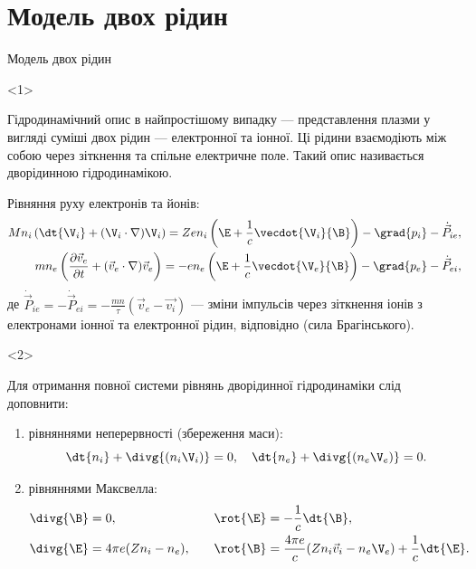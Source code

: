 \documentclass[]{beamer}
\begin{document}
\section{Модель двох рідин}

\begin{frame}{Модель двох рідин}{}
	\begin{onlyenv}
		\begin{block}{}\justifying
			Гідродинамічний опис в найпростішому випадку --- представлення плазми у вигляді суміші двох рідин --- електронної та іонної. Ці рідини взаємодіють між собою через \alert{зіткнення} та \alert{спільне електричне поле}. Такий опис називається дворідинною гідродинамікою.

			\bigskip

			Рівняння руху електронів та йонів:
			\begin{align*}
				Mn_i\left(\dt{\V_i} + (\V_i\cdot\nabla)\V_i \right) = Zen_i \left(\E + \frac1c \vecdot{\V_i}{\B} \right) - \grad{p_i} - \dot{\vec{P}}_{ie}, \\
				mn_e\left(\frac{\partial\vec{v}_e}{\partial t} + (\vec{v}_e\cdot\nabla)\vec{v}_e \right) = -en_e \left(\E + \frac1c \vecdot{\V_e}{\B}\right) -\grad{p_e} - \dot{\vec{P}}_{ei},
			\end{align*}де $\dot{\vec{P}}_{ie} = - \dot{\vec{P}}_{ei} = - \frac{mn}{\tau}(\vec{v}_e - \vec{v_i})$ --- зміни імпульсів через зіткнення іонів з електронами іонної та електронної рідин, відповідно (сила Брагінського).
		\end{block}
	\end{onlyenv}
	\begin{onlyenv}
		\begin{block}{}\justifying
			Для отримання повної системи рівнянь дворідинної гідродинаміки слід доповнити:
			\begin{enumerate}
				\item рівняннями неперервності (збереження маси):
				      \begin{equation*}
					      \dt{n_i} + \divg{(n_{i}\V_i)} = 0, \quad
					      \dt{n_e} + \divg{(n_{e}\V_e)} = 0.
				      \end{equation*}
				\item рівняннями Максвелла:
				      \begin{alignat*}{2}
					      \divg{\B} & = 0, \quad                  &  & \rot{\E} = -\frac1c \dt{\B},                                            \\
					      \divg{\E} & = 4\pi e(Zn_i - n_e), \quad &  & \rot{\B} = \frac{4\pi e}{c}(Zn_i\vec{v}_i - n_e\V_e) + \frac1c \dt{\E}.
				      \end{alignat*}
			\end{enumerate}
		\end{block}
	\end{onlyenv}
\end{frame}
\end{document}
